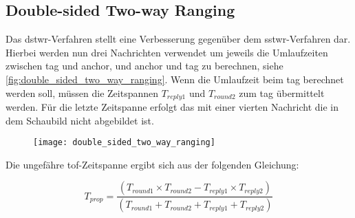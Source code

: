 %
%
\subsection{Double-sided Two-way Ranging}
\label{subsec:double_sided_two_way_ranging}

Das \Gls{dstwr}-Verfahren stellt eine Verbesserung gegenüber dem \Gls{sstwr}-Verfahren dar. Hierbei werden nun drei Nachrichten verwendet um jeweils die Umlaufzeiten zwischen \Gls{tag} und \Gls{anchor}, und \Gls{anchor} und \Gls{tag} zu berechnen, siehe \autoref{fig:double_sided_two_way_ranging}. Wenn die Umlaufzeit beim \Gls{tag} berechnet werden soll, müssen die Zeitspannen $T_{reply1}$ und $T_{round2}$ zum \Gls{tag} übermittelt werden. Für die letzte Zeitspanne erfolgt das mit einer vierten Nachricht die in dem Schaubild nicht abgebildet ist. \cite{decawave2015twr, decawave2016dw1kusermanual}

\begin{figure}
	\centering
	\texttt{[image: double\_sided\_two\_way\_ranging]}
	\label{fig:double_sided_two_way_ranging}
\end{figure}

Die ungefähre \Gls{tof}-Zeitspanne ergibt sich aus der folgenden Gleichung:

\begin{equation}
T_{prop} = \frac{\left(T_{round1}\times T_{round2}-T_{reply1}\times T_{reply2}\right)}{\left(T_{round1}+T_{round2}+T_{reply1}+T_{reply2}\right)}
\end{equation}

